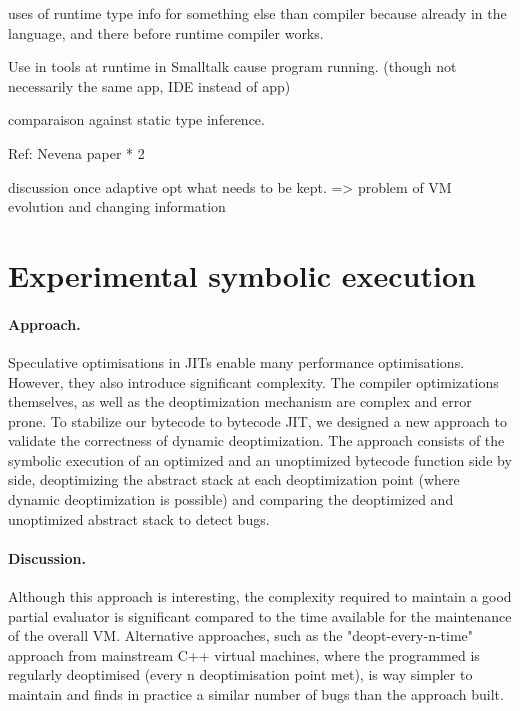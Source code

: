 \documentclass[a4paper,12pt,twoside]{../includes/ThesisStyle}
\begin{document}
uses of runtime type info for something else than compiler because already in the language, and there before runtime compiler works.

Use in tools at runtime in Smalltalk cause program running. (though not necessarily the same app, IDE instead of app)

comparaison against static type inference.

Ref: Nevena paper * 2

discussion once adaptive opt what needs to be kept.
=> problem of VM evolution and changing information

\section{Experimental symbolic execution}

\paragraph{Approach.}Speculative optimisations in JITs enable many performance optimisations. However, they also introduce significant complexity. The compiler optimizations themselves, as well as the deoptimization mechanism are complex and error prone. To stabilize our bytecode to bytecode JIT, we designed a new approach to validate the correctness of dynamic deoptimization. The approach \cite{bera16a} consists of the symbolic execution of an optimized and an unoptimized bytecode function side by side, deoptimizing the abstract stack at each deoptimization point (where dynamic deoptimization is possible) and comparing the deoptimized and unoptimized abstract stack to detect bugs. 

\paragraph{Discussion.}Although this approach is interesting, the complexity required to maintain a good partial evaluator is significant compared to the time available for the maintenance of the overall VM. Alternative approaches, such as the "deopt-every-n-time" approach from mainstream C++ virtual machines, where the programmed is regularly deoptimised (every n deoptimisation point met), is way simpler to maintain and finds in practice a similar number of bugs than the approach built. 

\ifx\wholebook\relax\else
    
\end{document}
